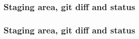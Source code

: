 \documentclass{beamer}
\begin{document}
    \begin{frame}
        \frametitle{Staging area, git diff and status}
        \begin{figure}[H]
            \centering
            \noindent
            \label{fig:figure6}
        \end{figure}
    \end{frame}
    \begin{frame}
        \frametitle{Staging area, git diff and status}
        \begin{figure}[H]
            \centering
            \noindent
        \end{figure}
    \end{frame}
\end{document}
